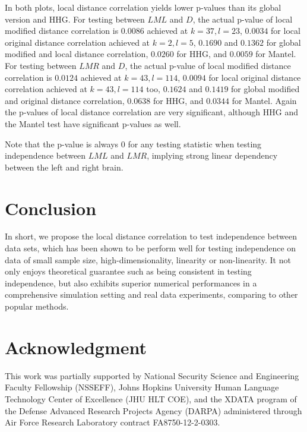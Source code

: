 \documentclass[12pt]{article}
\begin{document}
In both plots, local distance correlation yields lower p-values than its global version and HHG. For testing between $LML$ and $D$, the actual p-value of local modified distance correlation is $0.0086$ achieved at $k=37,l=23$, $0.0034$ for local original distance correlation achieved at $k=2,l=5$, $0.1690$ and $0.1362$ for global modified and local distance correlation, $0.0260$ for HHG, and $0.0059$ for Mantel. For testing between $LMR$ and $D$, the actual p-value of local modified distance correlation is $0.0124$ achieved at $k=43,l=114$, $0.0094$ for local original distance correlation achieved at $k=43,l=114$ too, $0.1624$ and $0.1419$ for global modified and original distance correlation, $0.0638$ for HHG, and $0.0344$ for Mantel. Again the p-values of local distance correlation are very significant, although HHG and the Mantel test have significant p-values as well.

Note that the p-value is always $0$ for any testing statistic when testing independence between $LML$ and $LMR$, implying strong linear dependency between the left and right brain.

\section{Conclusion}
\label{conclu}
In short, we propose the local distance correlation to test independence between data sets, which has been shown to be perform well for testing independence on data of small sample size, high-dimensionality, linearity or non-linearity. It not only enjoys theoretical guarantee such as being consistent in testing independence, but also exhibits superior numerical performances in a comprehensive simulation setting and real data experiments, comparing to other popular methods.

\section*{Acknowledgment}
This work was partially supported by National Security Science and Engineering Faculty Fellowship (NSSEFF),
 Johns Hopkins University Human Language Technology Center of Excellence (JHU HLT COE), and the
 XDATA program of the Defense Advanced Research Projects Agency (DARPA) administered through Air Force Research Laboratory contract FA8750-12-2-0303.




\end{document}
